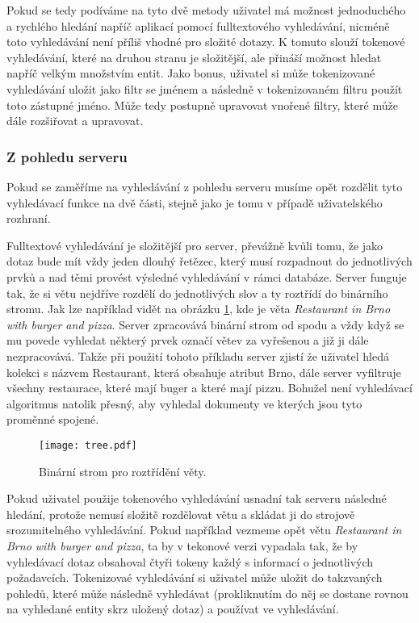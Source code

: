 \par Pokud se tedy podíváme na tyto dvě metody uživatel má možnost jednoduchého a rychlého hledání napříč aplikací pomocí fulltextového vyhledávání, nicméně toto vyhledávání není příliš vhodné pro složité dotazy. K tomuto slouží tokenové vyhledávání, které na druhou stranu je složitější, ale přináší možnost hledat napříč velkým množstvím entit. Jako bonus, uživatel si může tokenizované vyhledávání uložit jako filtr se jménem a následně v tokenizovaném filtru použít toto zástupné jméno. Může tedy postupně upravovat vnořené filtry, které může dále rozšiřovat a upravovat.

\subsubsection{Z pohledu serveru}
\par Pokud se zaměříme na vyhledávání z pohledu serveru musíme opět rozdělit tyto vyhledávací funkce na dvě části, stejně jako je tomu v případě uživatelského rozhraní.

\par Fulltextové vyhledávání je složitější pro server, převážně kvůli tomu, že jako dotaz bude mít vždy jeden dlouhý řetězec, který musí rozpadnout do jednotlivých prvků a nad těmi provést výsledné vyhledávání v rámci databáze. Server funguje tak, že si větu nejdříve rozdělí do jednotlivých slov a ty roztřídí do binárního stromu. Jak lze například vidět na obrázku \ref{binarni-strom}, kde je věta \textit{Restaurant in Brno with burger and pizza}. Server zpracovává binární strom od spodu a vždy když se mu povede vyhledat některý prvek označí větev za vyřešenou a již ji dále nezpracovává. Takže při použití tohoto příkladu server zjistí že uživatel hledá kolekci s názvem Restaurant, která obsahuje atribut Brno, dále server vyfiltruje všechny restaurace, které mají buger a které mají pizzu. Bohužel není vyhledávací algoritmus natolik přesný, aby vyhledal dokumenty ve kterých jsou tyto proměnné spojené.

\begin{figure}[!htb]
\centering
\texttt{[image: tree.pdf]}
\caption{Binární strom pro roztřídění věty.}
\label{binarni-strom}
\end{figure}

\par Pokud uživatel použije tokenového vyhledávání usnadní tak serveru následné hledání, protože nemusí složitě rozdělovat větu a skládat ji do strojově srozumitelného vyhledávání. Pokud například vezmeme opět větu \textit{Restaurant in Brno with burger and pizza}, ta by v tekonové verzi vypadala tak, že by vyhledávací dotaz obsahoval čtyři tokeny každý s informací o jednotlivých požadavcích. Tokenizovaé vyhledávání si uživatel může uložit do takzvaných pohledů, které může následně vyhledávat (prokliknutím do něj se dostane rovnou na vyhledané entity skrz uložený dotaz) a používat ve vyhledávání.

